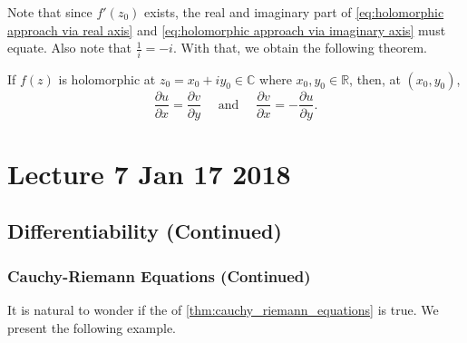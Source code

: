 \documentclass[11pt, oneside]{book}
\begin{document}
Note that since $f'(z_0)$ exists, the real and imaginary part of \cref{eq:holomorphic approach via real axis} and \cref{eq:holomorphic approach via imaginary axis} must equate. Also note that $\frac{1}{i} = -i$. With that, we obtain the following theorem.

\begin{thm}\label{thm:cauchy_riemann_equations}
	If $f(z)$ is holomorphic at $z_0 = x_0 + iy_0 \in \mathbb{C}$ where $x_0, y_0 \in \mathbb{R}$, then, at $(x_0, y_0)$,
	\begin{equation}\label{eq:cauchy_riemann_equations}
		\frac{\partial u}{\partial x} = \frac{\partial v}{\partial y} \quad \text{ and } \quad \frac{\partial v}{\partial x} = - \frac{\partial u}{\partial y}.
	\end{equation}
\end{thm}



\chapter{Lecture 7 Jan 17 2018}
	\label{chapter:lecture_7_jan_17_2018}

\section{Differentiability (Continued)} %
\label{sec:differentiability_continued}

\subsection{Cauchy-Riemann Equations (Continued)} %
\label{sub:cauchy_riemann_equations_continued}

It is natural to wonder if the  of \cref{thm:cauchy_riemann_equations} is true. We present the following example.
\end{document}
